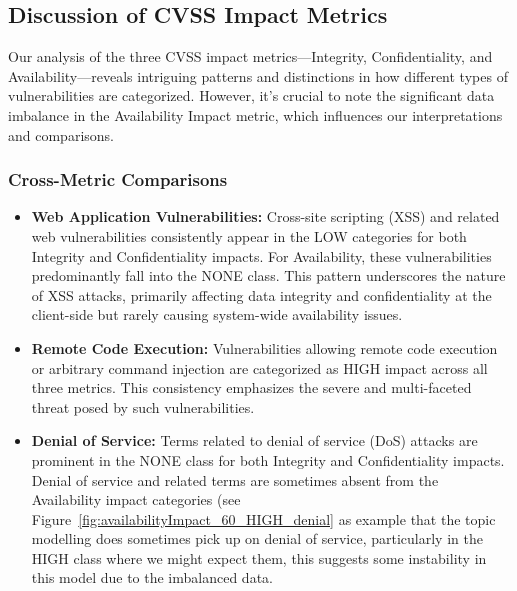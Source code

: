 \documentclass[12pt]{article}
\begin{document}
\subsection{Discussion of CVSS Impact Metrics}

Our analysis of the three CVSS impact metrics---Integrity, Confidentiality, and
Availability---reveals intriguing patterns and distinctions in how different types of
vulnerabilities are categorized. However, it's crucial to note the significant data imbalance in the
Availability Impact metric, which influences our interpretations and comparisons.

\subsubsection{Cross-Metric Comparisons}

\begin{itemize}

	\item \textbf{Web Application Vulnerabilities:} Cross-site scripting (XSS) and related web
	      vulnerabilities consistently appear in the LOW categories for both Integrity and
	      Confidentiality impacts. For Availability, these vulnerabilities predominantly fall into the
	      NONE class. This pattern underscores the nature of XSS attacks, primarily affecting data
	      integrity and confidentiality at the client-side but rarely causing system-wide availability
	      issues.

	\item \textbf{Remote Code Execution:} Vulnerabilities allowing remote code execution or
	      arbitrary command injection are categorized as HIGH impact across all three metrics. This
	      consistency emphasizes the severe and multi-faceted threat posed by such vulnerabilities.

	\item \textbf{Denial of Service:} Terms related to denial of service (DoS) attacks are prominent
	      in the NONE class for both Integrity and Confidentiality impacts. Denial of service and
	      related terms are sometimes absent from the Availability impact categories (see
	      Figure~\ref{fig:availabilityImpact_60_HIGH_denial} as example that the topic modelling does
	      sometimes pick up on denial of service, particularly in the HIGH class where we might expect
	      them, this suggests some instability in this model due to the imbalanced data.

\end{itemize}
\end{document}
